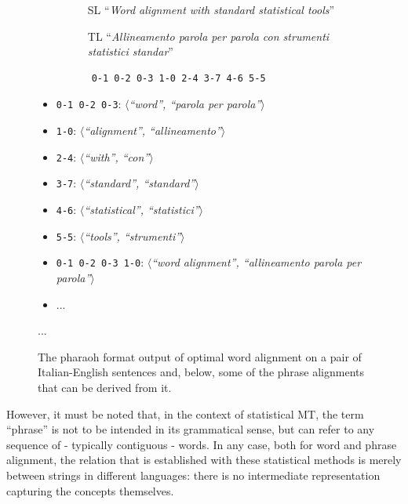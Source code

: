 \begin{figure}[h]
    \centering
    \begin{subfigure}{.55\textwidth}
      \centering
      \footnotesize
      \begin{itemize}
          \item[SL] ``\textit{Word alignment with standard statistical tools}''
          \item[TL] ``\textit{Allineamento parola per parola con strumenti statistici standar}''
      \end{itemize}
    \end{subfigure}%
    \begin{subfigure}{.45\textwidth}
        \centering
        \footnotesize
        \setlength{\unitlength}{0.21mm}
        \begin{verbatim}
    0-1 0-2 0-3 1-0 2-4 3-7 4-6 5-5
        \end{verbatim}
    \end{subfigure}
    \footnotesize
    \smallskip
    \smallskip
    \begin{itemize}
        \item \texttt{0-1 0-2 0-3}: $\langle$\textit{``word'', ``parola per parola''}$\rangle$
        \item \texttt{1-0}: $\langle$\textit{``alignment'', ``allineamento''}$\rangle$
        \item \texttt{2-4}: $\langle$\textit{``with'', ``con''}$\rangle$
        \item \texttt{3-7}: $\langle$\textit{``standard'', ``standard''}$\rangle$
        \item \texttt{4-6}: $\langle$\textit{``statistical'', ``statistici''}$\rangle$
        \item \texttt{5-5}: $\langle$\textit{``tools'', ``strumenti''}$\rangle$
        \item \texttt{0-1 0-2 0-3 1-0}: $\langle$\textit{``word alignment'', ``allineamento parola per parola''}$\rangle$
        \item ...
    \end{itemize}
    ...
    \caption[The pharaoh format output of optimal word alignment on a pair of Italian-English sentences and some derived phrase alignments]{The pharaoh format output of optimal word alignment on a pair of Italian-English sentences and, below, some of the phrase alignments that can be derived from it.}
    \label{wordalgn}
\end{figure}

However, it must be noted that, in the context of statistical MT, the term ``phrase'' is not to be intended in its grammatical sense, but can refer to any sequence of - typically contiguous - words. 
In any case, both for word and phrase alignment, the relation that is established with these statistical methods is merely between strings in different languages: there is no intermediate representation capturing the concepts themselves. \smallskip

